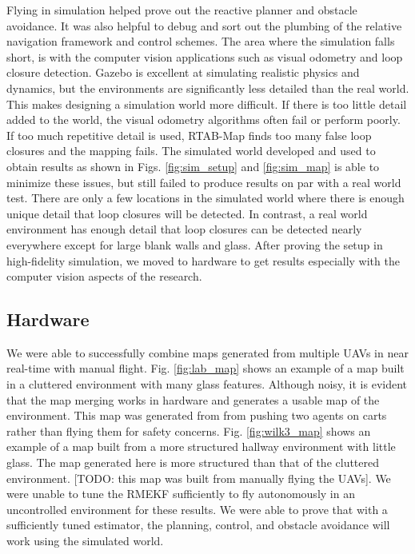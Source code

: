 \documentclass[letterpaper, 10 pt, conference]{ieeeconf}  %
\newcommand{\todo}[1]{{\color{blue}[TODO: #1]}}
\begin{document}
Flying in simulation helped prove out the reactive planner and obstacle avoidance. It was also helpful to debug and sort out the plumbing of the relative navigation framework and control schemes. The area where the simulation falls short, is with the computer vision applications such as visual odometry and loop closure detection. Gazebo is excellent at simulating realistic physics and dynamics, but the environments are significantly less detailed than the real world. This makes designing a simulation world more difficult. If there is too little detail added to the world, the visual odometry algorithms often fail or perform poorly. If too much repetitive detail is used, RTAB-Map finds too many false loop closures and the mapping fails. The simulated world developed and used to obtain results as shown in Figs. \ref{fig:sim_setup} and \ref{fig:sim_map} is able to minimize these issues, but still failed to produce results on par with a real world test. There are only a few locations in the simulated world where there is enough unique detail that loop closures will be detected. In contrast, a real world environment has enough detail that loop closures can be detected nearly everywhere except for large blank walls and glass. After proving the setup in high-fidelity simulation, we moved to hardware to get results especially with the computer vision aspects of the research.

\subsection{Hardware}

We were able to successfully combine maps generated from multiple UAVs in near real-time with manual flight. Fig. \ref{fig:lab_map} shows an example of a map built in a cluttered environment with many glass features. Although noisy, it is evident that the map merging works in hardware and generates a usable map of the environment. This map was generated from from pushing two agents on carts rather than flying them for safety concerns. Fig. \ref{fig:wilk3_map} shows an example of a map built from a more structured hallway environment with little glass. The map generated here is more structured than that of the cluttered environment. \todo{this map was built from manually flying the UAVs}. We were unable to tune the RMEKF sufficiently to fly autonomously in an uncontrolled environment for these results. We were able to prove that with a sufficiently tuned estimator, the planning, control, and obstacle avoidance will work using the simulated world.
\end{document}
